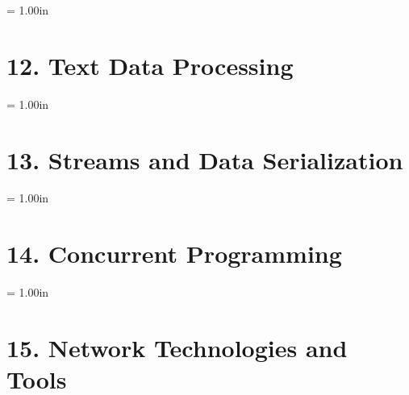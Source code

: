 \documentclass[a4paper,12pt]{article}
\begin{document}
\newpage\thispagestyle{empty}\pdfpageheight = 1.00in\enlargethispage{100in}

\section{12. Text Data Processing}



\newpage\thispagestyle{empty}\pdfpageheight = 1.00in\enlargethispage{100in}

\section{13. Streams and Data Serialization}



\newpage\thispagestyle{empty}\pdfpageheight = 1.00in\enlargethispage{100in}

\section{14. Concurrent Programming}



\newpage\thispagestyle{empty}\pdfpageheight = 1.00in\enlargethispage{100in}

\section{15. Network Technologies and Tools}
\end{document}
